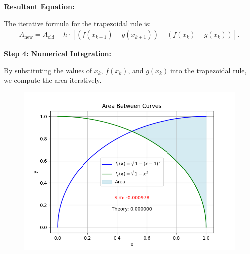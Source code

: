 \documentclass[journal]{IEEEtran}
\begin{document}
\textbf{Resultant Equation:}

The iterative formula for the trapezoidal rule is:
\begin{align}
    A_{\text{new}} = A_{\text{old}} + h \cdot \left[(f(x_{k+1}) - g(x_{k+1})) + (f(x_k) - g(x_k)) \right].
\end{align}

\textbf{Step 4: Numerical Integration:}

By substituting the values of $x_k$, $f(x_k)$, and $g(x_k)$ into the trapezoidal rule, we compute the area iteratively.


\begin{figure}[h!]
    \centering
    \includegraphics[width=\columnwidth]{figs/fig.png} 
\end{figure}
\end{document}
